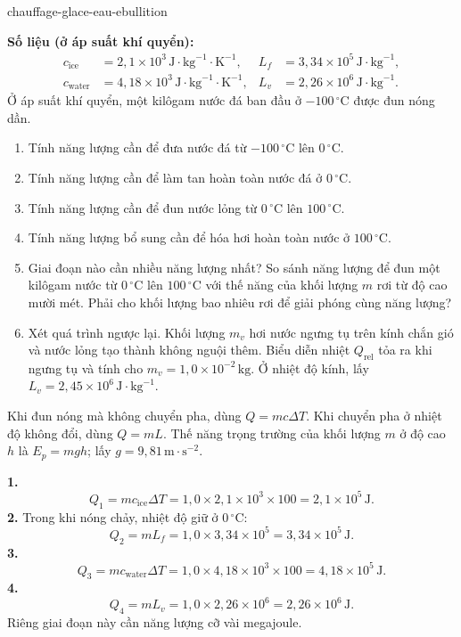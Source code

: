 
\begin{exo}{chauffage-glace-eau-ebullition}

\textbf{Số liệu (ở áp suất khí quyển):}
\[
\begin{aligned}
c_{\text{ice}} &= 2{,}1\times10^3\,\text{J}\!\cdot\!\text{kg}^{-1}\!\cdot\!\text{K}^{-1},
& L_f &= 3{,}34\times10^5\,\text{J}\!\cdot\!\text{kg}^{-1},\\
c_{\text{water}} &= 4{,}18\times10^3\,\text{J}\!\cdot\!\text{kg}^{-1}\!\cdot\!\text{K}^{-1},
& L_v &= 2{,}26\times10^6\,\text{J}\!\cdot\!\text{kg}^{-1}.
\end{aligned}
\]
Ở áp suất khí quyển, một kilôgam nước đá ban đầu ở $-100\,{}^\circ\text{C}$ được đun nóng dần.
\begin{enumerate}
  \item Tính năng lượng cần để đưa nước đá từ $-100\,{}^\circ\text{C}$ lên $0\,{}^\circ\text{C}$.
  \item Tính năng lượng cần để làm tan hoàn toàn nước đá ở $0\,{}^\circ\text{C}$.
  \item Tính năng lượng cần để đun nước lỏng từ $0\,{}^\circ\text{C}$ lên $100\,{}^\circ\text{C}$.
  \item Tính năng lượng bổ sung cần để hóa hơi hoàn toàn nước ở $100\,{}^\circ\text{C}$.
  \item Giai đoạn nào cần nhiều năng lượng nhất? So sánh năng lượng để đun một kilôgam nước từ $0\,{}^\circ\text{C}$ lên $100\,{}^\circ\text{C}$ với thế năng của khối lượng $m$ rơi từ độ cao mười mét. Phải cho khối lượng bao nhiêu rơi để giải phóng cùng năng lượng?
  \item Xét quá trình ngược lại. Khối lượng $m_v$ hơi nước ngưng tụ trên kính chắn gió và nước lỏng tạo thành không nguội thêm. Biểu diễn nhiệt $Q_{\text{rel}}$ tỏa ra khi ngưng tụ và tính cho $m_v=1{,}0\times10^{-2}\,\text{kg}$. Ở nhiệt độ kính, lấy $L_v=2{,}45\times10^6\,\text{J}\!\cdot\!\text{kg}^{-1}$.
\end{enumerate}
\begin{indication}
Khi đun nóng mà không chuyển pha, dùng $Q=mc\Delta T$. Khi chuyển pha ở nhiệt độ không đổi, dùng $Q=mL$. Thế năng trọng trường của khối lượng $m$ ở độ cao $h$ là $E_p=mgh$; lấy $g=9{,}81\,\text{m}\!\cdot\!\text{s}^{-2}$.
\end{indication}
\begin{solution}
\textbf{1.}
\[
Q_1=mc_{\text{ice}}\Delta T
=1{,}0\times2{,}1\times10^3\times100=2{,}1\times10^5\,\text{J}.
\]
\textbf{2.} Trong khi nóng chảy, nhiệt độ giữ ở $0\,{}^\circ\text{C}$:
\[
Q_2=mL_f=1{,}0\times3{,}34\times10^5=3{,}34\times10^5\,\text{J}.
\]
\textbf{3.}
\[
Q_3=mc_{\text{water}}\Delta T
=1{,}0\times4{,}18\times10^3\times100=4{,}18\times10^5\,\text{J}.
\]
\textbf{4.}
\[
Q_4=mL_v=1{,}0\times2{,}26\times10^6=2{,}26\times10^6\,\text{J}.
\]
Riêng giai đoạn này cần năng lượng cỡ vài megajoule.


\end{solution}
\end{exo}
